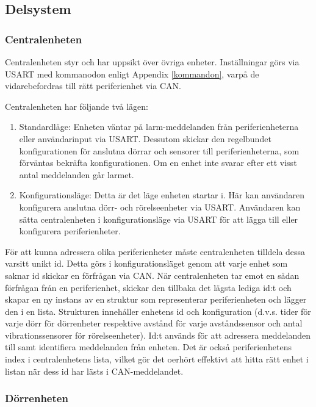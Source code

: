 \documentclass{article}
\begin{document}
\subsection{Delsystem }
\subsubsection{Centralenheten}
Centralenheten styr och har uppsikt över övriga enheter.
Inställningar görs via USART med kommanodon enligt Appendix \ref{kommandon}, varpå de vidarebefordras till rätt periferienhet via CAN.

Centralenheten har följande två lägen:

\begin{enumerate}
    \item Standardläge: Enheten väntar på larm-meddelanden från periferienheterna eller användarinput via USART. Dessutom skickar den regelbundet konfigurationen för anslutna dörrar och sensorer till periferienheterna, som förväntas bekräfta konfigurationen.
    Om en enhet inte svarar efter ett visst antal meddelanden går larmet.
    \item Konfigurationsläge: Detta är det läge enheten startar i.
    Här kan användaren konfigurera anslutna dörr- och rörelseenheter via USART. Användaren kan sätta centralenheten i konfigurationsläge via USART för att lägga till eller konfigurera periferienheter.
\end{enumerate}

För att kunna adressera olika periferienheter måste centralenheten tilldela dessa varsitt unikt id.
Detta görs i konfigurationsläget genom att varje enhet som saknar id skickar en förfrågan via CAN.
När centralenheten tar emot en sådan förfrågan från en periferienhet, skickar den tillbaka det
lägsta lediga id:t och skapar en ny instans av en struktur som representerar periferienheten och lägger den i en lista. Strukturen innehåller enhetens id och konfiguration (d.v.s. tider för varje dörr för dörrenheter respektive avstånd för varje avståndssensor och antal vibrationssensorer för rörelseenheter).
Id:t används för att adressera meddelanden till samt identifiera meddelanden från enheten. Det är också
periferienhetens index i centralenhetens lista, vilket gör det oerhört effektivt att hitta rätt
enhet i listan när dess id har lästs i CAN-meddelandet.





\subsubsection{Dörrenheten}
\label{subsec:Dörrenheten}
\end{document}
